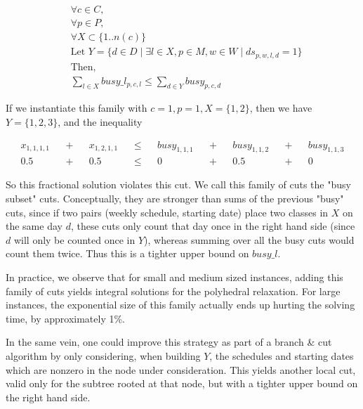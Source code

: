 \begin{align*}
&\forall c \in C,\\
&\forall p \in P,\\
&\forall X \subset \{1 .. n(c)\}\\
&\text{Let }Y = \{d \in D \mid \exists l \in X, p \in M, w \in W \mid ds_{p, w, l, d} = 1\}\\
&\text{Then, }\\
&\sum_{l \in X} busy\_l_{p, c, l} \le \sum_{d \in Y} busy_{p, c, d}
\end{align*}

If we instantiate this family with $c = 1, p = 1, X = \{1, 2\}$, then we have $Y = \{1, 2, 3\}$, and the inequality

\begin{align*}
&x_{1, 1, 1, 1}& &+& &x_{1, 2, 1, 1}& &\le& &busy_{1, 1, 1}& &+& &busy_{1, 1, 2}& &+& &busy_{1, 1, 3}&\\
&0.5& &+& &0.5& &\le& &0& &+& &0.5& &+& &0&
\end{align*}

So this fractional solution violates this cut. We call this family of cuts the "busy subset" cuts. Conceptually, they are stronger than sums of the previous "busy" cuts, since if two pairs (weekly schedule, starting date) place two classes in $X$ on the same day $d$, these cuts only count that day once in the right hand side (since $d$ will only be counted once in $Y$), whereas summing over all the busy cuts would count them twice. Thus this is a tighter upper bound on $busy\_l$.

In practice, we observe that for small and medium sized instances, adding this family of cuts yields integral solutions for the polyhedral relaxation. For large instances, the exponential size of this family actually ends up hurting the solving time, by approximately 1\%.

In the same vein, one could improve this strategy as part of a branch \& cut algorithm by only considering, when building $Y$, the schedules and starting dates which are nonzero in the node under consideration. This yields another local cut, valid only for the subtree rooted at that node, but with a tighter upper bound on the right hand side.
